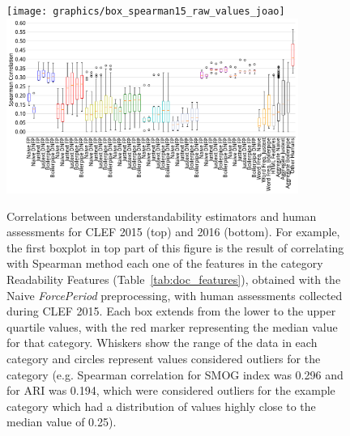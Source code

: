 \begin{figure}[h!]
   \centering
   \texttt{[image: graphics/box\_spearman15\_raw\_values\_joao]}\vspace{-7pt}
      \includegraphics[width=0.85\textwidth]{graphics/box_spearman16_raw_values}
    \caption{Correlations between understandability estimators and human assessments for CLEF 2015 (top) and 2016 (bottom). For example, the first boxplot in top part of this figure is the result of correlating with Spearman method each one of the features in the category Readability Features (Table~\ref{tab:doc_features}), obtained with the Naive \textit{ForcePeriod} preprocessing, with human assessments collected during CLEF 2015. Each box extends from the lower to the upper quartile values, with the red marker representing the median value for that category. Whiskers show the range of the data in each category and circles represent values considered outliers for the category (e.g. Spearman correlation for SMOG index was 0.296 and for ARI was 0.194, which were considered outliers for the example category which had a distribution of values highly close to the median value of 0.25).}
   \label{fig:boxplot_corr_docs}
   \vspace{-10pt}
\end{figure}

%

